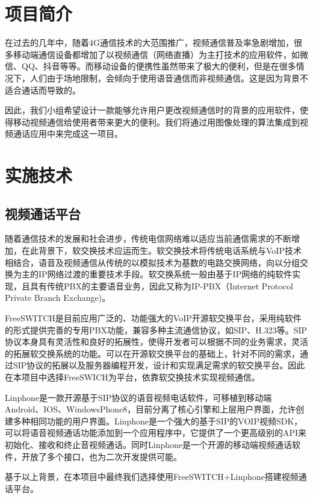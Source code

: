 \documentclass[14pt]{extarticle}
\title{\textbf{\begin{huge}第一次阶段检查进展汇报书\\~\\\end{huge}}\begin{LARGE}工科创\Romannum{3}-A储英专项03小组\\~\\~\\~\\~\\\end{LARGE}
}
\author{项目成员：\underline{魏思哲 517021910796}
\\
\qquad \qquad \quad \underline{王家乐 516015910041}\\
\qquad \qquad \quad \underline{曹靖宜 517021910381}\\~\\
指导老师：\underline{\quad 张文军\qquad 宋利\quad }\\~\\
}
\date{2019年10月24日}
\newcommand{\<}{\langle}
\renewcommand{\>}{\rangle}
\theoremstyle{definition}
\begin{document}
\maketitle
\thispagestyle{empty}
\renewcommand{\contentsname}{目录}
\tableofcontents
\thispagestyle{empty}
\newpage
\setcounter{page}{1}

\section{项目简介}
\par{\qquad 在过去的几年中，随着4G通信技术的大范围推广，视频通信普及率急剧增加，很多移动端通信设备都增加了以视频通信（网络直播）为主打技术的应用软件，如微信、QQ、抖音等等。而移动设备的便携性虽然带来了极大的便利，但是在很多情况下，人们由于场地限制，会倾向于使用语音通信而非视频通信。这是因为背景不适合通话而导致的。}
\par{因此，我们小组希望设计一款能够允许用户更改视频通信时的背景的应用软件，使得移动视频通信给使用者带来更大的便利。我们将通过用图像处理的算法集成到视频通话应用中来完成这一项目。}

\section{实施技术}
\subsection{视频通话平台}
\par{\qquad 随着通信技术的发展和社会进步，传统电信网络难以适应当前通信需求的不断增加，在此背景下，软交换技术应运而生。软交换技术将传统电话系统与VoIP技术相结合，语音及视频通信从传统的以模拟技术为基数的电路交换网络，向以分组交换为主的IP网络过渡的重要技术手段。软交换系统一般由基于IP网络的纯软件实现，且具有传统PBX的主要语音业务，因此又称为IP-PBX（Internet Protocol Private Branch Exchange)。}
\par{FreeSWITCH是目前应用广泛的、功能强大的VoIP开源软交换平台，采用纯软件的形式提供完善的专用PBX功能，兼容多种主流通信协议，如SIP、H.323等。SIP协议本身具有灵活性和良好的拓展性，使得开发者可以根据不同的业务需求，灵活的拓展软交换系统的功能。可以在开源软交换平台的基础上，针对不同的需求，通过SIP协议的拓展以及服务器编程开发，设计和实现满足需求的软交换平台。因此在本项目中选择FreeSWICH为平台，依靠软交换技术实现视频通信。}
\par{Linphone是一款开源基于SIP协议的语音视频电话软件，可移植到移动端Android、IOS、WindowsPhone8，目前分离了核心引擎和上层用户界面，允许创建多种相同功能的用户界面。Linphone是一个强大的基于SIP的VOIP视频SDK，可以将语音视频通话功能添加到一个应用程序中，它提供了一个更高级别的API来初始化、接收和终止音视频通话。同时Linphone是一个开源的移动端视频通话软件，开放了多个接口，也为二次开发提供可能。}
\par{基于以上背景，在本项目中最终我们选择使用FreeSWITCH+Linphone搭建视频通话平台。}
\end{document}
